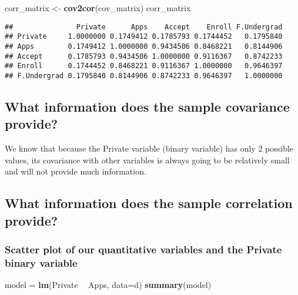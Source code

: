\documentclass[]{article}
\newenvironment{Shaded}{\begin{snugshade}}{\end{snugshade}}
\newcommand{\DataTypeTok}[1]{\textcolor[rgb]{0.13,0.29,0.53}{#1}}
\newcommand{\KeywordTok}[1]{\textcolor[rgb]{0.13,0.29,0.53}{\textbf{#1}}}
\newcommand{\NormalTok}[1]{#1}
\newcommand{\OperatorTok}[1]{\textcolor[rgb]{0.81,0.36,0.00}{\textbf{#1}}}
\newcommand{\StringTok}[1]{\textcolor[rgb]{0.31,0.60,0.02}{#1}}
\begin{document}
\begin{Shaded}
\begin{Highlighting}[]
\NormalTok{corr_matrix <-}\StringTok{ }\KeywordTok{cov2cor}\NormalTok{(cov_matrix)}
\NormalTok{corr_matrix}
\end{Highlighting}
\end{Shaded}

\begin{verbatim}
##               Private      Apps    Accept    Enroll F.Undergrad
## Private     1.0000000 0.1749412 0.1785793 0.1744452   0.1795840
## Apps        0.1749412 1.0000000 0.9434506 0.8468221   0.8144906
## Accept      0.1785793 0.9434506 1.0000000 0.9116367   0.8742233
## Enroll      0.1744452 0.8468221 0.9116367 1.0000000   0.9646397
## F.Undergrad 0.1795840 0.8144906 0.8742233 0.9646397   1.0000000
\end{verbatim}

\hypertarget{what-information-does-the-sample-covariance-provide}{%
\subsection{What information does the sample covariance
provide?}\label{what-information-does-the-sample-covariance-provide}}

We know that because the Private variable (binary variable) has only 2
possible values, its covariance with other variables is always going to
be relatively small and will not provide much information.

\newpage

\hypertarget{what-information-does-the-sample-correlation-provide}{%
\subsection{What information does the sample correlation
provide?}\label{what-information-does-the-sample-correlation-provide}}

\hypertarget{scatter-plot-of-our-quantitative-variables-and-the-private-binary-variable}{%
\subsubsection{Scatter plot of our quantitative variables and the
Private binary
variable}\label{scatter-plot-of-our-quantitative-variables-and-the-private-binary-variable}}

\begin{Shaded}
\begin{Highlighting}[]
\NormalTok{model =}\StringTok{ }\KeywordTok{lm}\NormalTok{(Private }\OperatorTok{~}\StringTok{ }\NormalTok{Apps, }\DataTypeTok{data=}\NormalTok{d)}
\KeywordTok{summary}\NormalTok{(model)}
\end{Highlighting}
\end{Shaded}
\end{document}
